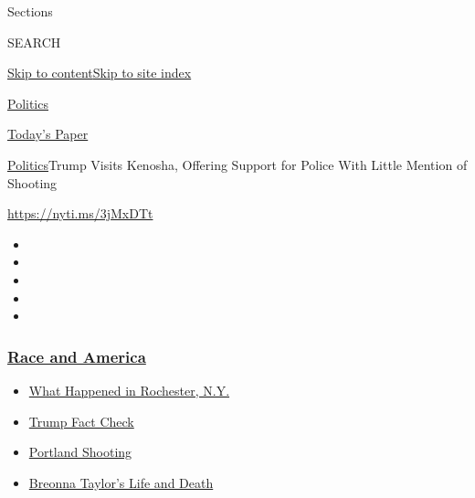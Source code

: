 Sections

SEARCH

\protect\hyperlink{site-content}{Skip to
content}\protect\hyperlink{site-index}{Skip to site index}

\href{https://www.nytimes3xbfgragh.onion/section/politics}{Politics}

\href{https://myaccount.nytimes3xbfgragh.onion/auth/login?response_type=cookie\&client_id=vi}{}

\href{https://www.nytimes3xbfgragh.onion/section/todayspaper}{Today's
Paper}

\href{/section/politics}{Politics}\textbar{}Trump Visits Kenosha,
Offering Support for Police With Little Mention of Shooting

\url{https://nyti.ms/3jMxDTt}

\begin{itemize}
\item
\item
\item
\item
\item
\end{itemize}

\hypertarget{race-and-america}{%
\subsubsection{\texorpdfstring{\href{https://www.nytimes3xbfgragh.onion/news-event/george-floyd-protests-minneapolis-new-york-los-angeles?name=styln-george-floyd\&region=TOP_BANNER\&block=storyline_menu_recirc\&action=click\&pgtype=Article\&impression_id=04ae5ba0-f281-11ea-ae9e-df40165d4ecf\&variant=undefined}{Race
and America}}{Race and America}}\label{race-and-america}}

\begin{itemize}
\tightlist
\item
  \href{https://www.nytimes3xbfgragh.onion/2020/09/04/nyregion/rochester-police-daniel-prude.html?name=styln-george-floyd\&region=TOP_BANNER\&block=storyline_menu_recirc\&action=click\&pgtype=Article\&impression_id=04ae82b0-f281-11ea-ae9e-df40165d4ecf\&variant=undefined}{What
  Happened in Rochester, N.Y.}
\item
  \href{https://www.nytimes3xbfgragh.onion/2020/09/01/us/politics/trump-fact-check-protests.html?name=styln-george-floyd\&region=TOP_BANNER\&block=storyline_menu_recirc\&action=click\&pgtype=Article\&impression_id=04ae82b1-f281-11ea-ae9e-df40165d4ecf\&variant=undefined}{Trump
  Fact Check}
\item
  \href{https://www.nytimes3xbfgragh.onion/2020/08/30/us/portland-shooting-explained.html?name=styln-george-floyd\&region=TOP_BANNER\&block=storyline_menu_recirc\&action=click\&pgtype=Article\&impression_id=04ae82b2-f281-11ea-ae9e-df40165d4ecf\&variant=undefined}{Portland
  Shooting}
\item
  \href{https://www.nytimes3xbfgragh.onion/2020/08/30/us/breonna-taylor-police-killing.html?name=styln-george-floyd\&region=TOP_BANNER\&block=storyline_menu_recirc\&action=click\&pgtype=Article\&impression_id=04ae82b3-f281-11ea-ae9e-df40165d4ecf\&variant=undefined}{Breonna
  Taylor's Life and Death}
\end{itemize}


